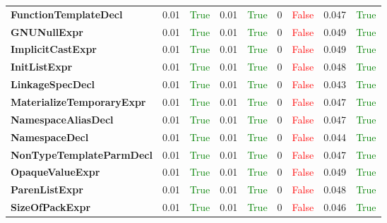 \documentclass{article}
\begin{document}
\begin{xltabular}{\textwidth}{lcccccccc}
\textbf{{\fontsize{10}{12}\selectfont FunctionTemplateDecl}}& 0.01&\textcolor{green}{True}& 0.01&\textcolor{green}{True}& 0&\textcolor{red}{False}& 0.047&\textcolor{green}{True} \\[0.5ex]
\textbf{{\fontsize{10}{12}\selectfont GNUNullExpr}}& 0.01&\textcolor{green}{True}& 0.01&\textcolor{green}{True}& 0&\textcolor{red}{False}& 0.049&\textcolor{green}{True} \\[0.5ex]
\textbf{{\fontsize{10}{12}\selectfont ImplicitCastExpr}}& 0.01&\textcolor{green}{True}& 0.01&\textcolor{green}{True}& 0&\textcolor{red}{False}& 0.049&\textcolor{green}{True} \\[0.5ex]
\textbf{{\fontsize{10}{12}\selectfont InitListExpr}}& 0.01&\textcolor{green}{True}& 0.01&\textcolor{green}{True}& 0&\textcolor{red}{False}& 0.048&\textcolor{green}{True} \\[0.5ex]
\textbf{{\fontsize{10}{12}\selectfont LinkageSpecDecl}}& 0.01&\textcolor{green}{True}& 0.01&\textcolor{green}{True}& 0&\textcolor{red}{False}& 0.043&\textcolor{green}{True} \\[0.5ex]
\textbf{{\fontsize{10}{12}\selectfont MaterializeTemporaryExpr}}& 0.01&\textcolor{green}{True}& 0.01&\textcolor{green}{True}& 0&\textcolor{red}{False}& 0.047&\textcolor{green}{True} \\[0.5ex]
\textbf{{\fontsize{10}{12}\selectfont NamespaceAliasDecl}}& 0.01&\textcolor{green}{True}& 0.01&\textcolor{green}{True}& 0&\textcolor{red}{False}& 0.047&\textcolor{green}{True} \\[0.5ex]
\textbf{{\fontsize{10}{12}\selectfont NamespaceDecl}}& 0.01&\textcolor{green}{True}& 0.01&\textcolor{green}{True}& 0&\textcolor{red}{False}& 0.044&\textcolor{green}{True} \\[0.5ex]
\textbf{{\fontsize{10}{12}\selectfont NonTypeTemplateParmDecl}}& 0.01&\textcolor{green}{True}& 0.01&\textcolor{green}{True}& 0&\textcolor{red}{False}& 0.047&\textcolor{green}{True} \\[0.5ex]
\textbf{{\fontsize{10}{12}\selectfont OpaqueValueExpr}}& 0.01&\textcolor{green}{True}& 0.01&\textcolor{green}{True}& 0&\textcolor{red}{False}& 0.049&\textcolor{green}{True} \\[0.5ex]
\textbf{{\fontsize{10}{12}\selectfont ParenListExpr}}& 0.01&\textcolor{green}{True}& 0.01&\textcolor{green}{True}& 0&\textcolor{red}{False}& 0.048&\textcolor{green}{True} \\[0.5ex]
\textbf{{\fontsize{10}{12}\selectfont SizeOfPackExpr}}& 0.01&\textcolor{green}{True}& 0.01&\textcolor{green}{True}& 0&\textcolor{red}{False}& 0.046&\textcolor{green}{True} \\[0.5ex]

\end{xltabular}
\end{document}
